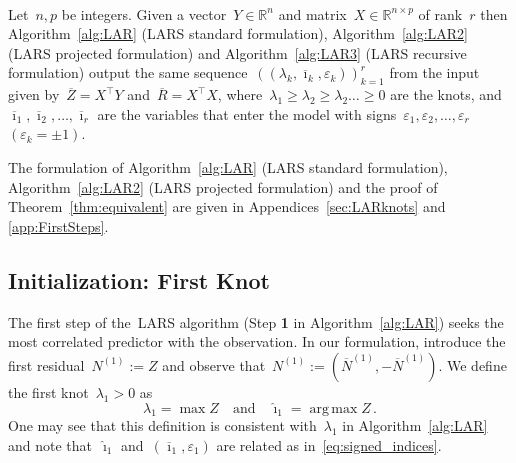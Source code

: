 \documentclass[final,numbib]{imaiai}%
\numberwithin{equation}{section}
\let\oldnl\nl%
\newcommand{\nonl}{\renewcommand{\nl}{\let\nl\oldnl}}%
\DeclareMathOperator*{\argmax}{arg\, max}
\renewcommand{\bar}{\overline}
\renewcommand{\hat}{\widehat}
\newcommand{\<}{\langle}
\renewcommand{\>}{\rangle}
\newcommand{\1}{\mathds{1}}
\begin{document}
{{\begin{algorithm}[!t]
\end{algorithm}
\
      \vspace{-0.5cm}
}


{
\begin{theorem}
\label{thm:equivalent}
Let~$n,p$ be integers. Given a vector~$Y\in\mathbb R^n$ and matrix~$X\in\mathds R^{n\times p}$ of rank~$r$ then Algorithm~\ref{alg:LAR} (LARS standard formulation), Algorithm~\ref{alg:LAR2} (LARS projected formulation) and  Algorithm~\ref{alg:LAR3} (LARS recursive formulation) output the same sequence~$((\lambda_k,\bar \imath_k, \varepsilon_k))_{k=1}^r$ from the input given by~$\bar Z=X^\top Y$ and~$\bar R=X^\top X$, where~$\lambda_1\geq\lambda_2\geq\lambda_2\ldots\geq0$ are the knots, and~$\bar \imath_1,\bar \imath_2,\ldots,\bar \imath_r$ are the variables that enter the model with signs~$\varepsilon_1,\varepsilon_2,\ldots,\varepsilon_r$~$(\varepsilon_k=\pm1)$.
\end{theorem}
\noindent The formulation of Algorithm~\ref{alg:LAR} (LARS standard formulation), Algorithm~\ref{alg:LAR2} (LARS projected formulation) and the proof of Theorem~\ref{thm:equivalent} are given in Appendices~\ref{sec:LARknots} and \ref{app:FirstSteps}.
}





\subsection{Initialization: First Knot}
The first step of the~LARS algorithm (Step {\bf 1} in Algorithm~\ref{alg:LAR}) seeks the most correlated predictor with the observation. In our formulation, introduce the first residual~$N^{(1)}:=Z$ and observe that~$N^{(1)}:=(\bar N^{(1)},-\bar N^{(1)})$. We define the first knot~$\lambda_1>0$ as 
\[
\lambda_1=\displaystyle\max Z\quad \mathrm{and}\quad\hat \imath _1 = \argmax Z\,.
\]  
\noindent
One may see that this definition is consistent with~$\lambda_1$ in Algorithm~\ref{alg:LAR} and note that~$\hat \imath_1$ and~$(\bar \imath_1,\varepsilon_1)$ are related as in~\eqref{eq:signed_indices}.


}
\end{document}

